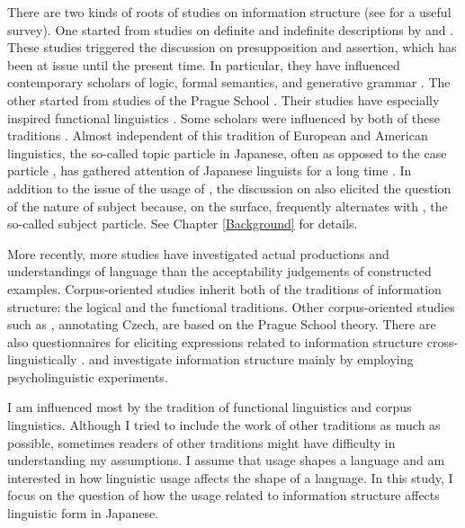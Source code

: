 There are two kinds of roots of studies on information structure
(see  for a useful survey).
One started from studies on definite and indefinite descriptions by  and .
These studies triggered the discussion on presupposition and assertion,
which has been at issue until the present time.
In particular, they have influenced contemporary scholars of logic, formal semantics, and generative grammar \cite{chomsky65,jackendoff72,selkirk84,rooth85,rizzi97,erteschik-shir97,erteschik-shir07,buring07,ishihara11,krifkamusan12,endo14}.
The other started from studies of the Prague School \cite{mathesius28,mathesius29,sgall67,firbas75}.
Their studies have especially inspired functional linguistics
\cite{bolinger65,halliday67,kuno73,gundel74,chafe76,chafe94,prince81,givon83,tomlin86,lambrecht94,birnerward98,birnerward09}.
Some scholars were influenced by both of these traditions
\cite{vallduvi90,steedman91,vallduvivilkuna98}.%
Almost independent of this tradition of European and American linguistics,
the so-called topic particle  in Japanese,
often as opposed to the case particle ,
has gathered attention of Japanese linguists for a long time \cite{matsushita28,yamada36,tokieda50,mikami53,mikami60,onoe81,kinsui95,kikuchi95,noda96,masuoka00,masuoka12}.
In addition to the issue of the usage of ,
the discussion on  also elicited the question of the nature of subject
because, on the surface,  frequently alternates with ,
the so-called subject particle.
See Chapter \ref{Background} for details.

More recently,
more studies have investigated actual productions and understandings of language than the acceptability judgements of constructed examples.
Corpus-oriented studies  
\cite[e.g.,][]{calhounetal05,gotzeetal07,chiarcosetal11}
inherit both of the traditions of information structure:
the logical and the functional traditions.
Other corpus-oriented studies such as ,
annotating Czech, are based on the Prague School theory.
There are also questionnaires for eliciting expressions related to information structure cross-linguistically \cite{skopeteasetal06}.
 and  investigate information structure mainly by employing psycholinguistic experiments.

I am influenced most by the tradition of functional linguistics and corpus linguistics.
Although I tried to include the work of other traditions as much as possible, sometimes readers of other traditions might have difficulty in understanding my assumptions.
I assume that usage shapes a language \cite{givon76,comrie83,comrie89,bybeehopper01} and
am interested in how linguistic usage affects the shape of a language.
In this study,
I focus on the question of how the usage related to information structure affects linguistic form in Japanese.


